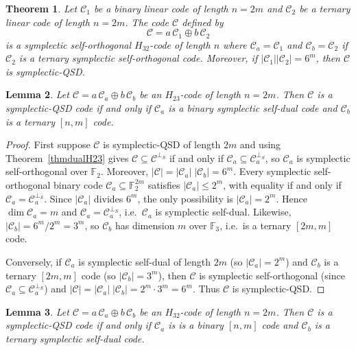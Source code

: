 \documentclass[11pt,a4paper]{article}
\newtheorem{theorem}{Theorem}[section]
\newtheorem{lemma}[theorem]{Lemma}
\theoremstyle{definition}
\numberwithin{equation}{section}
\def\C{{\mathcal{C}}}
\begin{document}
\begin{theorem}\label{thmbinaryternary2} Let $\C_1$ be a binary linear code of length $n=2m$ and $\C_2$ be a ternary linear code of length $n=2m$. The code $\C$ defined by
\[\C=a\,\C_1\oplus b\,\C_2\] 
is a symplectic self-orthogonal $H_{32}$-code of length $n$ where $\C_a=\C_1$ and $\C_b=\C_2$ if $\C_2$ is a ternary symplectic  self-orthogonal code. Moreover, if $|\C_1||\C_2|=  6^{m}$, then $\C$ is symplectic-QSD.
\end{theorem}


\begin{lemma}\label{H23QSD}
Let $\C=a\, \C_a \oplus b\, \C_b$ be an $H_{23}$-code of length $n=2m$. Then  $\C$ is a symplectic-QSD code  if and only if  $\C_a$ is a binary symplectic self-dual code and $\C_b$ is a ternary $[n,m]$ code.	
\end{lemma}


\begin{proof}
First suppose \(\C\) is symplectic-QSD of length \(2m\) and using Theorem~\ref{thmdualH23} gives \(\C\subseteq\C^{\perp_S}\) if and only if \(\C_a\subseteq\C_a^{\perp_S}\), so \(\C_a\) is symplectic self-orthogonal over \(\mathbb F_2\).  Moreover, $|\C|=|\C_a|\;|\C_b|=6^m.$ Every symplectic self-orthogonal binary code \(\C_a\subseteq\mathbb F_2^{2m}\) satisfies \(|\C_a|\le2^m\), with equality if and only if \(\C_a=\C_a^{\perp_S}\).  Since \(|\C_a|\) divides \(6^m\), the only possibility is \(|\C_a|=2^m\).  Hence \(\dim\C_a=m\) and \(\C_a=\C_a^{\perp_S}\), i.e.\ \(\C_a\) is symplectic self-dual.  Likewise, \(|\C_b|=6^m/2^m=3^m\), so \(\C_b\) has dimension \(m\) over \(\mathbb F_3\), i.e.\ is a ternary \([2m,m]\) code.

Conversely, if \(\C_a\) is symplectic self-dual of length \(2m\) (so \(|\C_a|=2^m\)) and \(\C_b\) is a ternary \([2m,m]\) code (so \(|\C_b|=3^m\)), then $\C$ is symplectic self-orthogonal (since \(\C_a\subseteq\C_a^{\perp_S}\)) and $|\C|
=|\C_a|\;|\C_b|
=2^m\cdot3^m
=6^m.$ Thus \(\C\) is symplectic-QSD.  
\end{proof}


\begin{lemma}\label{H32QSD}
Let $\C=a\, \C_a \oplus b\, \C_b$ be an $H_{32}$-code of length $n=2m$. Then  $\C$ is a symplectic-QSD code  if and only if  $\C_a$ is  is a binary $[n,m]$ code  and $\C_b$ is a ternary symplectic self-dual code.
\end{lemma}
\end{document}
